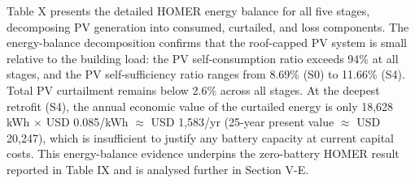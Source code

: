\documentclass[journal,fleqn]{IEEEtran}
\begin{document}
\par

Table X presents the detailed HOMER energy balance for all five stages, decomposing PV generation into consumed, curtailed, and loss components. The energy-balance decomposition confirms that the roof-capped PV system is small relative to the building load: the PV self-consumption ratio exceeds 94\% at all stages, and the PV self-sufficiency ratio ranges from 8.69\% (S0) to 11.66\% (S4). Total PV curtailment remains below 2.6\% across all stages. At the deepest retrofit (S4), the annual economic value of the curtailed energy is only 18,628 kWh $\times$ USD 0.085/kWh $\approx$ USD 1,583/yr (25-year present value $\approx$ USD 20,247), which is insufficient to justify any battery capacity at current capital costs. This energy-balance evidence underpins the zero-battery HOMER result reported in Table IX and is analysed further in Section V-E.
\end{document}
